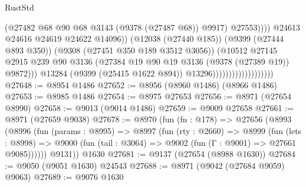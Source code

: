 \begin{lexlean}{RustStd}
\begin{coremodule}
                                                        (@27482
                                                          @68
                                                          @90
                                                          @68
                                                          @3143
                                                          (@9378 (@27487 @68))
                                                          @9917)
                                                        @27553))))
                                                @24613
                                                @24616
                                                @24619
                                                @24622
                                                @14096))
                                            (@12038 (@27440 @185))
                                            (@9399 (@27444 @893 @350))
                                            (@9308 (@27451 @350 @189 @3512 @3056))
                                            (@10512
                                              @27145
                                              @2915
                                              @239
                                              @90
                                              @3136
                                              (@27384
                                                @19
                                                @90
                                                @19
                                                @3136
                                                (@9378 (@27389 @19))
                                                @9872)))
                                          @13284
                                          (@9399 (@25415 @1622 @894))
                                          @13296)))))))))))))))))))
@27648 := @8954 @1486
@27652 := @8956 (@8960 @1486) (@8966 @1486)
@27653 := @8985 @1486
@27654 := @8975 @27653
@27656 := @8971 (@27654 @8990)
@27658 := @9013 (@9014 @1486)
@27659 := @9009 @27658
@27661 := @8971 (@27659 @9038)
@27678 := @8970
    (fun (fn : @178) =>
    @27656
      (@8993
        (@8996
          (fun (params : @8995) =>
          @8997
            (fun (rty : @2660) =>
            @8999
              (fun (lets : @8998) =>
              @9000 (fun (tail : @3064) => @9002 (fun (Γ : @9001) => @27661 @9085))))))
        @9131))
    @1630
@27681 := @9137 (@27654 (@8988 @1630))
@27684 := @9050 (@9051 @1630) @24543
@27688 := @8971 (@9042 (@27684 @9059) @9063)
@27689 := @9076 @1630

\end{coremodule}
\end{lexlean}
